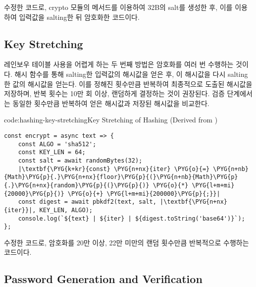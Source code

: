 \은 \을 수정한 코드로, crypto 모듈의  메서드를 이용하여 32B의 salt를 생성한 후, 이를 이용하여 입력값을 salting한 뒤 암호화한 코드이다.

\subsection*{Key Stretching}

레인보우 테이블 사용을 어렵게 하는 두 번째 방법은 암호화를 여러 번 수행하는 것이다. 해시 함수를 통해 salting한 입력값의 해시값을 얻은 후, 이 해시값을 다시 salting한 값의 해시값을 얻는다. 이를 정해진 횟수만큼 반복하여 최종적으로 도출된 해시값을 저장하며, 반복 횟수는 10만 회 이상, 랜덤하게 결정하는 것이 권장된다. 검증 단계에서는 동일한 횟수만큼 반복하여 얻은 해시값과 저장된 해시값을 비교한다.

\begin{code}{code:hashing-key-stretching}{Key Stretching of Hashing (Derived from )}
\begin{verbatim}
const encrypt = async text => {
    const ALGO = 'sha512';
    const KEY_LEN = 64;
    const salt = await randomBytes(32);
    |\textbf{\PYG{k+kr}{const} \PYG{n+nx}{iter} \PYG{o}{=} \PYG{n+nb}{Math}\PYG{p}{.}\PYG{n+nx}{floor}\PYG{p}{(}\PYG{n+nb}{Math}\PYG{p}{.}\PYG{n+nx}{random}\PYG{p}{(}\PYG{p}{)} \PYG{o}{*} \PYG{l+m+mi}{20000}\PYG{p}{)} \PYG{o}{+} \PYG{l+m+mi}{200000}\PYG{p}{;}}|
    const digest = await pbkdf2(text, salt, |\textbf{\PYG{n+nx}{iter}}|, KEY_LEN, ALGO);
    console.log(`${text} | ${iter} | ${digest.toString('base64')}`);
};
\end{verbatim}
\end{code}


\은 \을 수정한 코드로, 암호화를 20만 이상, 22만 미만의 랜덤 횟수만큼 반복적으로 수행하는 코드이다.

\subsection*{Password Generation and Verification}

